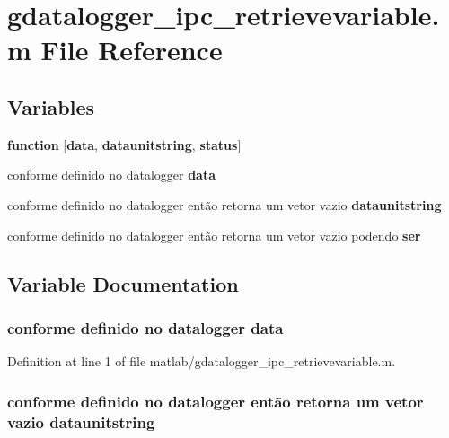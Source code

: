 \section{gdatalogger\_\-ipc\_\-retrievevariable.m File Reference}
\label{matlab_2gdatalogger__ipc__retrievevariable_8m}
\subsection*{Variables}
\begin{DoxyCompactItemize}
\item 
{\bf function} [{\bf data}, {\bf dataunitstring}, {\bf status}]
\item 
conforme definido no datalogger {\bf data}
\item 
conforme definido no datalogger então retorna um vetor vazio {\bf dataunitstring}
\item 
conforme definido no datalogger então retorna um vetor vazio podendo {\bf ser}
\end{DoxyCompactItemize}


\subsection{Variable Documentation}
\subsubsection[{data}]{\setlength{\rightskip}{0pt plus 5cm}conforme definido no datalogger {\bf data}}\label{matlab_2gdatalogger__ipc__retrievevariable_8m_ac0d85df49d1b1386f54c7cf9a02058a0}


Definition at line 1 of file matlab/gdatalogger\_\-ipc\_\-retrievevariable.m.
\subsubsection[{dataunitstring}]{\setlength{\rightskip}{0pt plus 5cm}conforme definido no datalogger então retorna um vetor vazio {\bf dataunitstring}}\label{matlab_2gdatalogger__ipc__retrievevariable_8m_a0170ec389057b3cd5906e3a196aea560}


